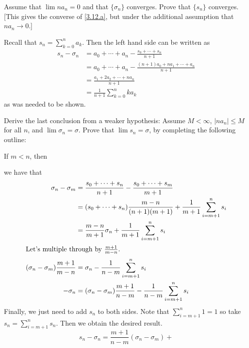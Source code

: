 \begin{exercise}
\begin{exercise}[label = (\alph*), ref = \arabic{exercisei} (\alph*)]
\[    \]
    Assume that \(\lim na_n = 0\) and that \(\{\sigma_n\}\) converges.
    Prove that \(\{s_n\}\) converges.
    [This gives the converse of \cref{3.12.a}, but under the additional assumption
    that \(na_n\to 0\).]
    \par\smallskip
    Recall that \(s_n = \sum_{k = 0}^na_k\).
    Then the left hand side can be written as
    \begin{align*}
      s_n - \sigma_n & = a_0 + \cdots + a_n -
                       \frac{s_0 + \cdots + s_n}{n + 1}\\
                     & = a_0 + \cdots + a_n -
                       \frac{(n + 1)a_0 + na_1 + \cdots + a_n}{n + 1}\\
                     & = \frac{a_1 + 2a_2 + \cdots + na_n}{n + 1}\\
                     & = \frac{1}{n + 1}\sum_{k = 0}^nka_k
    \end{align*}
    as was needed to be shown.
  \item
    Derive the last conclusion from a weaker hypothesis: Assume \(M < \infty\),
    \(\lvert na_n\rvert\leq M\) for all \(n\), and \(\lim\sigma_n = \sigma\).
    Prove that \(\lim s_n = \sigma\), by completing the following outline:
    \par\smallskip
    If \(m < n\), then
    \par\smallskip
    {\color{NavyBlue}
      we have that
      \begin{align*}
        \sigma_n - \sigma_m
        & = \frac{s_0 + \cdots + s_n}{n + 1} -
          \frac{s_0 + \cdots + s_m}{m + 1}\\
        & = (s_0 + \cdots + s_n)\frac{m - n}{(n + 1)(m + 1)} +
          \frac{1}{m + 1}\sum_{i = m + 1}^ns_i\\
        & = \frac{m - n}{m + 1}\sigma_n + \frac{1}{m + 1}
          \sum_{i = m + 1}^ns_i\\
        \intertext{Let's multiple through by \(\frac{m + 1}{m - n}\).}
        (\sigma_n - \sigma_m)\frac{m + 1}{m - n}
        & = \sigma_n - \frac{1}{n - m}\sum_{i = m + 1}^ns_i\\
        -\sigma_n & = (\sigma_n - \sigma_m)\frac{m + 1}{n - m} -
                    \frac{1}{n - m}\sum_{i = m + 1}^ns_i
      \end{align*}
      Finally, we just need to add \(s_n\) to both sides.
      Note that \(\sum_{i = m + 1}^n1 = 1\) so take
      \(s_n = \sum_{i = m + 1}^ns_n\).
      Then we obtain the desired result.
    }
    \[
    s_n - \sigma_n = \frac{m + 1}{n - m}(\sigma_n - \sigma_m) +
\]
\end{exercise}
\end{exercise}
